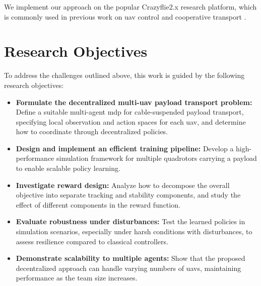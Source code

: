 We implement our approach on the popular Crazyflie2.x research platform, which is commonly used in previous work on \gls{uav} control and cooperative transport \autocite{Wahba2024,huang_collision_2024,eschmann_learning_2024,chen_what_2024}.
\section{Research Objectives}
To address the challenges outlined above, this work is guided by the following research objectives:
\begin{itemize}
    \item \textbf{Formulate the decentralized multi-\gls{uav} payload transport problem:} Define a suitable multi-agent \gls{mdp} for cable-suspended payload transport, specifying local observation and action spaces for each \gls{uav}, and determine how to coordinate through decentralized policies.
    \item \textbf{Design and implement an efficient training pipeline:} Develop a high-performance simulation framework for multiple quadrotors carrying a payload to enable scalable policy learning.
    \item \textbf{Investigate reward design:} Analyze how to decompose the overall objective into separate tracking and stability components, and study the effect of different components in the reward function.
    \item \textbf{Evaluate robustness under disturbances:} Test the learned policies in simulation scenarios, especially under harsh conditions with disturbances, to assess resilience compared to classical controllers.
    \item \textbf{Demonstrate scalability to multiple agents:} Show that the proposed decentralized approach can handle varying numbers of \glspl{uav}, maintaining performance as the team size increases.
\end{itemize}

